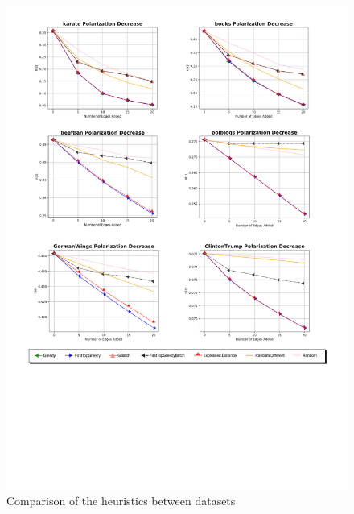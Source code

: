 \begin{figure}[!htbp]
	\begin{center}
	\advance\leftskip-1.3cm
	\captionsetup{justification=centering,margin=2cm}
	\includegraphics[width=1.2\textwidth]{Figures/heuristics}
	\caption{Comparison of the heuristics between datasets}
	\label{fig:heuristics_small}
	\end{center}
\end{figure}
\clearpage

